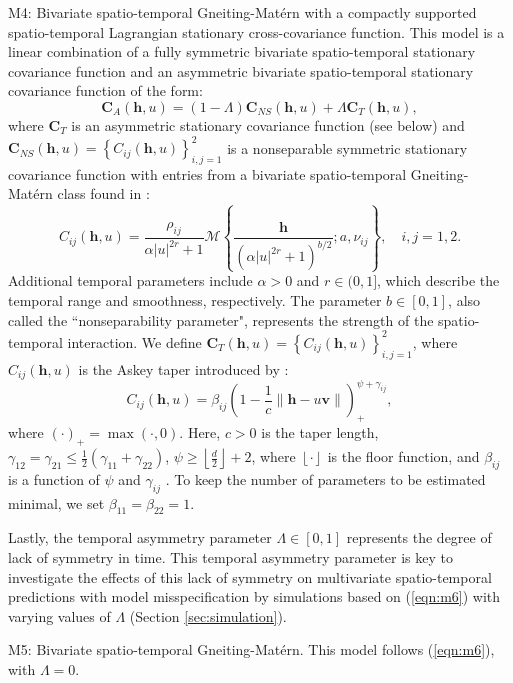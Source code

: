 \documentclass[12pt]{article}
\newcommand{\0}{\mathbf{0}}
\begin{document}
\begin{compactitem}
\item M4: Bivariate spatio-temporal Gneiting-Mat\'{e}rn with a compactly supported spatio-temporal Lagrangian stationary cross-covariance function. This model is a linear combination of a fully symmetric bivariate spatio-temporal stationary covariance function and an asymmetric bivariate spatio-temporal stationary covariance function of the form: 
\begin{equation}\label{eqn:m6}
\mathbf{C}_A(\mathbf{h},u)=(1-\Lambda)\mathbf{C}_{NS}(\mathbf{h},u)+\Lambda \mathbf{C}_{T}(\mathbf{h},u) ,
\end{equation}
where $\mathbf{C}_T$ is an asymmetric stationary covariance function (see below) and $\mathbf{C}_{NS}(\mathbf{h},u)=\left\{C_{ij}(\mathbf{h},u)\right\}_{i,j=1}^{2}$ is a nonseparable symmetric stationary covariance function with entries from a bivariate spatio-temporal Gneiting-Mat\'{e}rn class found in \citet{bourotte2016flexible}:
\begin{equation}\label{eqn:bivariategneitingmatern}
C_{ij}(\mathbf{h},u)=\frac{\rho_{ij}}{\alpha |u|^{2r}+1}\mathcal{M}\left\{\frac{\mathbf{h}}{(\alpha |u|^{2r}+1)^{b/2}};a,\nu_{ij}\right\},\quad i,j=1,2.
\end{equation}
Additional temporal parameters include $\alpha>0$ and $r\in (0,1]$, which describe the temporal range and smoothness, respectively. The parameter $b\in [0,1]$, also called the ``nonseparability parameter", represents the strength of the spatio-temporal interaction. We define $\mathbf{C}_{T}(\mathbf{h},u)=\left\{C_{ij}(\mathbf{h},u)\right\}_{i,j=1}^{2}$, where $C_{ij}(\mathbf{h},u)$ is the Askey taper introduced by \citet{roh2015multivariate}:
\begin{equation}
C_{ij}(\mathbf{h},u)=\beta_{ij}\left(1-\frac{1}{c}\|\mathbf{h}-u\mathbf{v}\|\right)_{+}^{\psi+\gamma_{ij}},
\end{equation}
where $(\cdot)_{+}=\max(\cdot,0)$. Here, $c>0$ is the taper length, $\gamma_{12}=\gamma_{21}\leq \frac{1}{2}(\gamma_{11}+\gamma_{22})$, $\psi\geq \left \lfloor{\frac{d}{2}}\right \rfloor+2$, where $\left \lfloor{\cdot}\right \rfloor$ is the floor function, and $\beta_{ij}$ is a function of $\psi$ and $\gamma_{ij}$ \citep{roh2015multivariate}. To keep the number of parameters to be estimated minimal, we set $\beta_{11}=\beta_{22}=1$.

Lastly, the temporal asymmetry parameter $\Lambda\in [0,1]$ represents the degree of lack of symmetry in time. This temporal asymmetry parameter is key to investigate the effects of this lack of symmetry on multivariate spatio-temporal predictions with model misspecification by simulations based on (\ref{eqn:m6}) with varying values of $\Lambda$ (Section \ref{sec:simulation}).

\item M5: Bivariate spatio-temporal Gneiting-Mat\'{e}rn. This model follows (\ref{eqn:m6}), with $\Lambda=0$. %
\end{compactitem}
\end{document}
